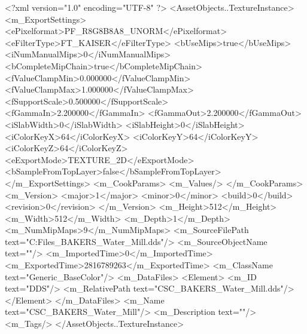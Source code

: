 <?xml version="1.0" encoding="UTF-8" ?>
<AssetObjects..TextureInstance>
	<m_ExportSettings>
		<ePixelformat>PF_R8G8B8A8_UNORM</ePixelformat>
		<eFilterType>FT_KAISER</eFilterType>
		<bUseMips>true</bUseMips>
		<iNumManualMips>0</iNumManualMips>
		<bCompleteMipChain>true</bCompleteMipChain>
		<fValueClampMin>0.000000</fValueClampMin>
		<fValueClampMax>1.000000</fValueClampMax>
		<fSupportScale>0.500000</fSupportScale>
		<fGammaIn>2.200000</fGammaIn>
		<fGammaOut>2.200000</fGammaOut>
		<iSlabWidth>0</iSlabWidth>
		<iSlabHeight>0</iSlabHeight>
		<iColorKeyX>64</iColorKeyX>
		<iColorKeyY>64</iColorKeyY>
		<iColorKeyZ>64</iColorKeyZ>
		<eExportMode>TEXTURE_2D</eExportMode>
		<bSampleFromTopLayer>false</bSampleFromTopLayer>
	</m_ExportSettings>
	<m_CookParams>
		<m_Values/>
	</m_CookParams>
	<m_Version>
		<major>1</major>
		<minor>0</minor>
		<build>0</build>
		<revision>0</revision>
	</m_Version>
	<m_Height>512</m_Height>
	<m_Width>512</m_Width>
	<m_Depth>1</m_Depth>
	<m_NumMipMaps>9</m_NumMipMaps>
	<m_SourceFilePath text="C:\Users\Shadow\Desktop\Working Files\Textures\CSC_BAKERS_Water_Mill.dds"/>
	<m_SourceObjectName text=""/>
	<m_ImportedTime>0</m_ImportedTime>
	<m_ExportedTime>2816789263</m_ExportedTime>
	<m_ClassName text="Generic_BaseColor"/>
	<m_DataFiles>
		<Element>
			<m_ID text="DDS"/>
			<m_RelativePath text="CSC_BAKERS_Water_Mill.dds"/>
		</Element>
	</m_DataFiles>
	<m_Name text="CSC_BAKERS_Water_Mill"/>
	<m_Description text=""/>
	<m_Tags/>
</AssetObjects..TextureInstance>

